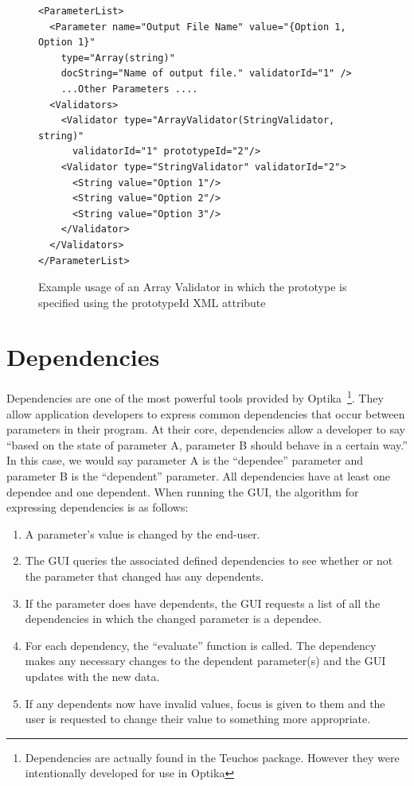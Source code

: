 \begin{figure}
\centering
{\footnotesize
\begin{Verbatim}
<ParameterList>
  <Parameter name="Output File Name" value="{Option 1, Option 1}" 
    type="Array(string)" 
    docString="Name of output file." validatorId="1" />
    ...Other Parameters ....
  <Validators>
    <Validator type="ArrayValidator(StringValidator, string)" 
      validatorId="1" prototypeId="2"/>
    <Validator type="StringValidator" validatorId="2">
      <String value="Option 1"/>
      <String value="Option 2"/>
      <String value="Option 3"/>
    </Validator>
  </Validators>
</ParameterList>
\end{Verbatim}
}
\caption{Example usage of an Array Validator in which the prototype is specified using the prototypeId XML attribute}
\label{protoAttributeArrayXML}
\end{figure}

\section{Dependencies}
Dependencies are one of the most powerful tools provided by Optika~\footnote{Dependencies are actually found in the Teuchos package. However they were 
intentionally developed for use in Optika}.
They allow application developers to express common dependencies that occur between
parameters in their program. At their core, dependencies allow a developer to say ``based on the state of parameter A, parameter B should
behave in a certain way.'' In this case, we would say parameter A is the ``dependee'' parameter and parameter B is the ``dependent'' parameter.
All dependencies have at least one dependee and one dependent. When running the GUI, the algorithm for expressing dependencies is as follows:
\begin{enumerate}
	\item A parameter's value is changed by the end-user.
	\item The GUI queries the associated defined dependencies to see whether or not the parameter that changed has any dependents.
	\item If the parameter does have dependents, the GUI requests a list of all the dependencies in which the changed
	parameter is a dependee.
	\item For each dependency, the ``evaluate'' function is called. The dependency makes any necessary changes to the dependent parameter(s)
	and the GUI updates with the new data.
	\item If any dependents now have invalid values, focus is given to them and the user is requested to change their value to
	something more appropriate.
\end{enumerate}

